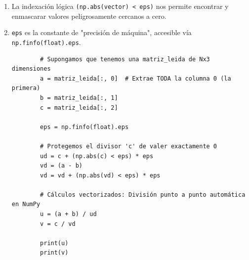 \begin{enumerate}
	\item La indexación lógica \verb-(np.abs(vector) < eps)- nos permite encontrar y enmascarar valores peligrosamente cercanos a cero.
	\item \texttt{eps} es la constante de "precisión de máquina", accesible vía \texttt{np.finfo(float).eps}.
	
	\begin{verbatim}
		# Supongamos que tenemos una matriz_leida de Nx3 dimensiones
		a = matriz_leida[:, 0]  # Extrae TODA la columna 0 (la primera)
		b = matriz_leida[:, 1]
		c = matriz_leida[:, 2]
		
		eps = np.finfo(float).eps
		
		# Protegemos el divisor 'c' de valer exactamente 0
		ud = c + (np.abs(c) < eps) * eps 
		vd = (a - b)
		vd = vd + (np.abs(vd) < eps) * eps
		
		# Cálculos vectorizados: División punto a punto automática en NumPy
		u = (a + b) / ud  
		v = c / vd        
		
		print(u)
		print(v)
	\end{verbatim}
\end{enumerate}
